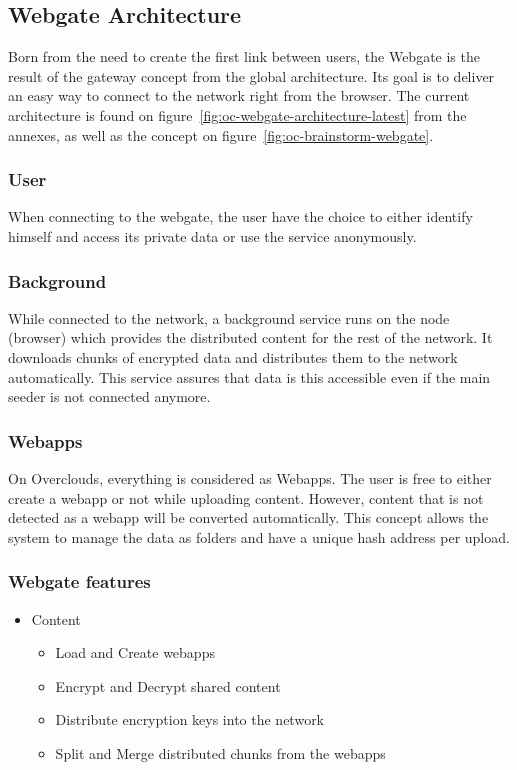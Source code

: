 
\subsection{Webgate Architecture}

Born from the need to create the first link between users, the Webgate is the result of the gateway concept from the global architecture. Its goal is to deliver an easy way to connect to the network right from the browser. The current architecture is found on figure~\ref{fig:oc-webgate-architecture-latest} from the annexes, as well as the concept on figure~\ref{fig:oc-brainstorm-webgate}.

\subsubsection{User} When connecting to the webgate, the user have the choice to either identify himself and access its private data or use the service anonymously.

\subsubsection{Background} While connected to the network, a background service runs on the node (browser) which provides the distributed content for the rest of the network. It downloads chunks of encrypted data and distributes them to the network automatically. This service assures that data is this accessible even if the main seeder is not connected anymore.

\subsubsection{Webapps} On Overclouds, everything is considered as Webapps. The user is free to either create a webapp or not while uploading content. However, content that is not detected as a webapp will be converted automatically. This concept allows the system to manage the data as folders and have a unique hash address per upload.

\subsubsection{Webgate features}
\begin{itemize}
\item Content
\begin{itemize}
\item Load and Create webapps
\item Encrypt and Decrypt shared content 
\item Distribute encryption keys into the network
\item Split and Merge distributed chunks from the webapps
\end{itemize}
\end{itemize}

